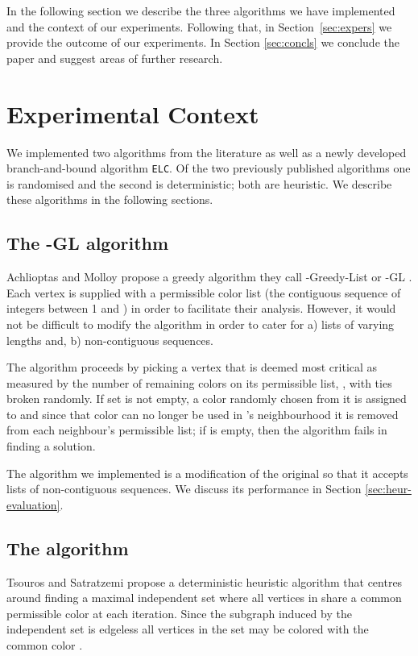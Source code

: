 \documentclass[10pt]{article}
\begin{document}
In the following section we describe the three algorithms we have
implemented and the context of our experiments.  Following that, in
Section~\ref{sec:expers} we provide the outcome of our experiments.  In
Section \ref{sec:concls} we conclude the paper and suggest areas of
further research.

\section{Experimental Context}\label{sec:exper-context}

We implemented two algorithms from the literature as well as a newly
developed branch-and-bound algorithm \texttt{ELC}.  Of the two previously published
algorithms one is randomised and the second is deterministic; both are
heuristic.  We describe these algorithms in the following sections.

\subsection{The -GL algorithm}\label{sec:k-gl-alg}

Achlioptas and Molloy propose a greedy algorithm they call
-Greedy-List or -GL \cite{Achlioptas97theanalysis}.  Each vertex
is supplied with a permissible color list 
(the contiguous sequence of integers between 1 and ) in order to
facilitate their analysis.  However, it would not be difficult to modify
the algorithm in order to cater for a) lists of varying lengths and, b)
non-contiguous sequences.

The algorithm proceeds by picking a vertex  that is deemed most
critical as measured by the number of remaining colors on its
permissible list, , with ties broken randomly.  If set  is not
empty, a color randomly chosen from it is assigned to  and since that
color can no longer be used in 's neighbourhood it is removed from
each neighbour's permissible list; if  is empty, then the
algorithm fails in finding a solution.

The algorithm we implemented is a modification
of the original \cite{Achlioptas97theanalysis} so that it accepts lists
of non-contiguous sequences.  We discuss its performance in Section
\ref{sec:heur-evaluation}.

\subsection{The  algorithm}

Tsouros and Satratzemi \cite{tsouros-satratzemi-05} propose a deterministic 
heuristic algorithm that centres around finding a maximal
independent set  where all vertices in  share a common permissible color 
 at each iteration.  Since the subgraph induced by the independent set  is 
edgeless all vertices in the set  may be colored with the common color .
\end{document}
